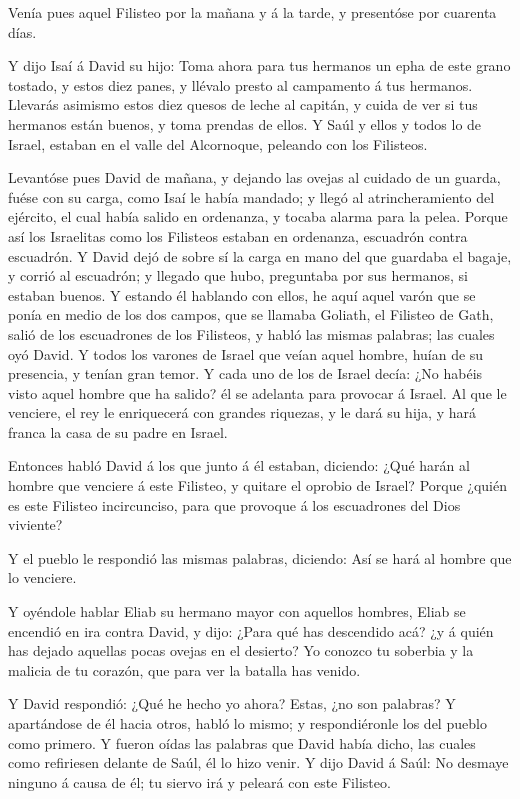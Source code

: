  Venía pues aquel Filisteo por la mañana y á la tarde, y
presentóse por cuarenta días.

 Y dijo Isaí á David su hijo: Toma ahora para tus hermanos
un epha de este grano tostado, y estos diez panes, y llévalo presto al
campamento á tus hermanos.  Llevarás asimismo estos diez
quesos de leche al capitán, y cuida de ver si tus hermanos están buenos,
y toma prendas de ellos.  Y Saúl y ellos y todos lo de
Israel, estaban en el valle del Alcornoque, peleando con los Filisteos.

 Levantóse pues David de mañana, y dejando las ovejas al
cuidado de un guarda, fuése con su carga, como Isaí le había mandado; y
llegó al atrincheramiento del ejército, el cual había salido en
ordenanza, y tocaba alarma para la pelea.  Porque así los
Israelitas como los Filisteos estaban en ordenanza, escuadrón contra
escuadrón.  Y David dejó de sobre sí la carga en mano del
que guardaba el bagaje, y corrió al escuadrón; y llegado que hubo,
preguntaba por sus hermanos, si estaban buenos.  Y estando
él hablando con ellos, he aquí aquel varón que se ponía en medio de los
dos campos, que se llamaba Goliath, el Filisteo de Gath, salió de los
escuadrones de los Filisteos, y habló las mismas palabras; las cuales
oyó David.  Y todos los varones de Israel que veían aquel
hombre, huían de su presencia, y tenían gran temor.  Y cada
uno de los de Israel decía: ¿No habéis visto aquel hombre que ha salido?
él se adelanta para provocar á Israel. Al que le venciere, el rey le
enriquecerá con grandes riquezas, y le dará su hija, y hará franca la
casa de su padre en Israel.

 Entonces habló David á los que junto á él estaban,
diciendo: ¿Qué harán al hombre que venciere á este Filisteo, y quitare
el oprobio de Israel? Porque ¿quién es este Filisteo incircunciso, para
que provoque á los escuadrones del Dios viviente?

 Y el pueblo le respondió las mismas palabras, diciendo:
Así se hará al hombre que lo venciere.

 Y oyéndole hablar Eliab su hermano mayor con aquellos
hombres, Eliab se encendió en ira contra David, y dijo: ¿Para qué has
descendido acá? ¿y á quién has dejado aquellas pocas ovejas en el
desierto? Yo conozco tu soberbia y la malicia de tu corazón, que para
ver la batalla has venido.

 Y David respondió: ¿Qué he hecho yo ahora? Estas, ¿no son
palabras?  Y apartándose de él hacia otros, habló lo mismo;
y respondiéronle los del pueblo como primero.  Y fueron
oídas las palabras que David había dicho, las cuales como refiriesen
delante de Saúl, él lo hizo venir.  Y dijo David á Saúl: No
desmaye ninguno á causa de él; tu siervo irá y peleará con este
Filisteo.

